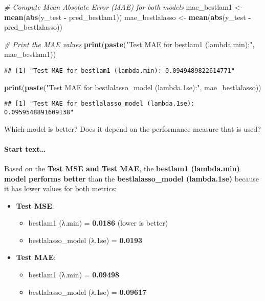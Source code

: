 \documentclass[
]{article}
\newenvironment{Shaded}{\begin{snugshade}}{\end{snugshade}}
\newcommand{\CommentTok}[1]{\textcolor[rgb]{0.56,0.35,0.01}{\textit{#1}}}
\newcommand{\FunctionTok}[1]{\textcolor[rgb]{0.13,0.29,0.53}{\textbf{#1}}}
\newcommand{\NormalTok}[1]{#1}
\newcommand{\OtherTok}[1]{\textcolor[rgb]{0.56,0.35,0.01}{#1}}
\newcommand{\SpecialCharTok}[1]{\textcolor[rgb]{0.81,0.36,0.00}{\textbf{#1}}}
\newcommand{\StringTok}[1]{\textcolor[rgb]{0.31,0.60,0.02}{#1}}
\begin{document}
\begin{Shaded}
\begin{Highlighting}[]
\CommentTok{\# Compute Mean Absolute Error (MAE) for both models}
\NormalTok{mae\_bestlam1 }\OtherTok{\textless{}{-}} \FunctionTok{mean}\NormalTok{(}\FunctionTok{abs}\NormalTok{(y\_test }\SpecialCharTok{{-}}\NormalTok{ pred\_bestlam1))}
\NormalTok{mae\_bestlalasso }\OtherTok{\textless{}{-}} \FunctionTok{mean}\NormalTok{(}\FunctionTok{abs}\NormalTok{(y\_test }\SpecialCharTok{{-}}\NormalTok{ pred\_bestlalasso))}

\CommentTok{\# Print the MAE values}
\FunctionTok{print}\NormalTok{(}\FunctionTok{paste}\NormalTok{(}\StringTok{"Test MAE for bestlam1 (lambda.min):"}\NormalTok{, mae\_bestlam1))}
\end{Highlighting}
\end{Shaded}

\begin{verbatim}
## [1] "Test MAE for bestlam1 (lambda.min): 0.0949489822614771"
\end{verbatim}

\begin{Shaded}
\begin{Highlighting}[]
\FunctionTok{print}\NormalTok{(}\FunctionTok{paste}\NormalTok{(}\StringTok{"Test MAE for bestlalasso\_model (lambda.1se):"}\NormalTok{, mae\_bestlalasso))}
\end{Highlighting}
\end{Shaded}

\begin{verbatim}
## [1] "Test MAE for bestlalasso_model (lambda.1se): 0.0959548891609138"
\end{verbatim}

Which model is better? Does it depend on the performance measure that is
used?

\hypertarget{start-text-1}{%
\paragraph{Start text\ldots{}}\label{start-text-1}}

Based on the \textbf{Test MSE and Test MAE}, the \textbf{bestlam1
(lambda.min) model performs better} than the \textbf{bestlalasso\_model
(lambda.1se)} because it has lower values for both metrics:

\begin{itemize}
\item
  \textbf{Test MSE}:

  \begin{itemize}
  \item
    bestlam1 (λ.min) = \textbf{0.0186} (lower is better)
  \item
    bestlalasso\_model (λ.1se) = \textbf{0.0193}
  \end{itemize}
\item
  \textbf{Test MAE}:

  \begin{itemize}
  \item
    bestlam1 (λ.min) = \textbf{0.09498}
  \item
    bestlalasso\_model (λ.1se) = \textbf{0.09617}
  \end{itemize}
\end{itemize}
\end{document}
